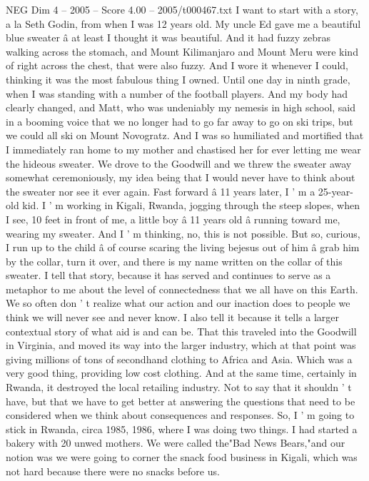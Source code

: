 \begin{textsample}{NEG Dim 4 – 2005 – Score 4.00 – 2005/t000467.txt}  \label{ex:f4_neg_068}
I want to start with a story, a la Seth Godin, from when I was 12 years old.
My uncle Ed gave me a beautiful blue sweater â at least I thought it was beautiful.
And it had fuzzy zebras walking across the stomach, and Mount Kilimanjaro and Mount Meru were kind of right across the chest, that were also fuzzy.
And I wore it whenever I could, thinking it was the most fabulous thing I owned.
Until one day in ninth grade, when I was standing with a number of the football players.
And my body had clearly changed, and Matt, who was undeniably my nemesis in high school, said in a booming voice that we no longer had to go far away to go on ski trips, but we could all ski on Mount Novogratz.
And I was so humiliated and mortified that I immediately ran home to my mother and chastised her for ever letting me wear the hideous sweater.
We drove to the Goodwill and we threw the sweater away somewhat ceremoniously, my idea being that I would never have to think about the sweater nor see it ever again.
Fast forward â 11 years later, I ' m a 25-year-old kid.
I ' m working in Kigali, Rwanda, jogging through the steep slopes, when I see, 10 feet in front of me, a little boy â 11 years old â running toward me, wearing my sweater.
And I ' m thinking, no, this is not possible.
But so, curious, I run up to the child â of course scaring the living bejesus out of him â grab him by the collar, turn it over, and there is my name written on the collar of this sweater.
I tell that story, because it has served and continues to serve as a metaphor to me about the level of connectedness that we all have on this Earth.
We so often don ' t realize what our action and our inaction does to people we think we will never see and never know.
I also tell it because it tells a larger contextual story of what aid is and can be.
That this traveled into the Goodwill in Virginia, and moved its way into the larger industry, which at that point was giving millions of tons of secondhand clothing to Africa and Asia.
Which was a very good thing, providing low cost clothing.
And at the same time, certainly in Rwanda, it destroyed the local retailing industry.
Not to say that it shouldn ' t have, but that we have to get better at answering the questions that need to be considered when we think about consequences and responses.
So, I ' m going to stick in Rwanda, circa 1985, 1986, where I was doing two things.
I had started a bakery with 20 unwed mothers.
We were called the"Bad News Bears,"and our notion was we were going to corner the snack food business in Kigali, which was not hard because there were no snacks before us.

\end{textsample}
